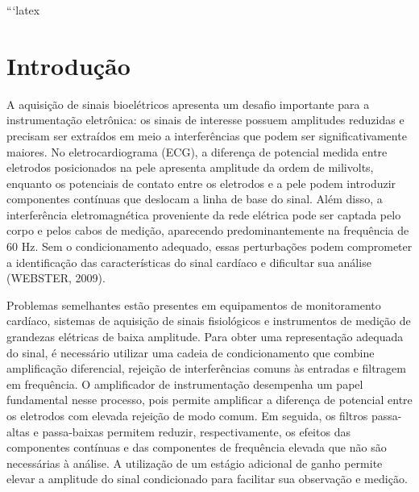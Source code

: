 \documentclass[11pt,a4paper]{article}
\begin{document}
\capa


```latex
\section{Introdução}

A aquisição de sinais bioelétricos apresenta um desafio importante para a instrumentação eletrônica: os sinais de interesse possuem amplitudes reduzidas e precisam ser extraídos em meio a interferências que podem ser significativamente maiores. No eletrocardiograma (ECG), a diferença de potencial medida entre eletrodos posicionados na pele apresenta amplitude da ordem de milivolts, enquanto os potenciais de contato entre os eletrodos e a pele podem introduzir componentes contínuas que deslocam a linha de base do sinal. Além disso, a interferência eletromagnética proveniente da rede elétrica pode ser captada pelo corpo e pelos cabos de medição, aparecendo predominantemente na frequência de 60 Hz. Sem o condicionamento adequado, essas perturbações podem comprometer a identificação das características do sinal cardíaco e dificultar sua análise (WEBSTER, 2009).

Problemas semelhantes estão presentes em equipamentos de monitoramento cardíaco, sistemas de aquisição de sinais fisiológicos e instrumentos de medição de grandezas elétricas de baixa amplitude. Para obter uma representação adequada do sinal, é necessário utilizar uma cadeia de condicionamento que combine amplificação diferencial, rejeição de interferências comuns às entradas e filtragem em frequência. O amplificador de instrumentação desempenha um papel fundamental nesse processo, pois permite amplificar a diferença de potencial entre os eletrodos com elevada rejeição de modo comum. Em seguida, os filtros passa-altas e passa-baixas permitem reduzir, respectivamente, os efeitos das componentes contínuas e das componentes de frequência elevada que não são necessárias à análise. A utilização de um estágio adicional de ganho permite elevar a amplitude do sinal condicionado para facilitar sua observação e medição.
\end{document}
